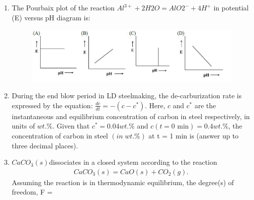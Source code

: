 \documentclass[journal]{IEEEtran}
\theoremstyle{remark}
\begin{document}
\begin{enumerate}
\item The Pourbaix plot of the reaction $Al^{3+} + 2H2O = AlO2^{-} + 4H^{+}$ in potential (E) versus pH diagram is: \hfill{}
\begin{figure}[H]
    \centering
    \includegraphics[width=0.9\columnwidth]{figs/Q.33.png}
    \caption{}
    \label{fig:placeholder}
\end{figure}
\item During the end blow period in LD steelmaking, the de-carburization rate is expressed by the equation: $\frac{dc}{dt} = -(c-c^*)$. Here, $c$ and $c^*$ are the instantaneous and equilibrium concentration of carbon in steel respectively, in units of $wt.\%$. Given that $c^* = 0.04 wt.\%$ and $c(t=0 \text{ min}) = 0.4 wt.\%$, the concentration of carbon in steel $(in\;wt.\%)$ at t = 1 min is \underline {\hspace{2cm}} (answer up to three decimal places). \hfill{}

\item $CaCO_3(s)$dissociates in a closed system according to the reaction
\begin{align}
CaCO_3(s) = CaO(s) + CO_2(g).
\end{align}
Assuming the reaction is in thermodynamic equilibrium, the degree(s) of freedom, F = \underline {\hspace{2cm}} \hfill{}


\end{enumerate}
\end{document}
